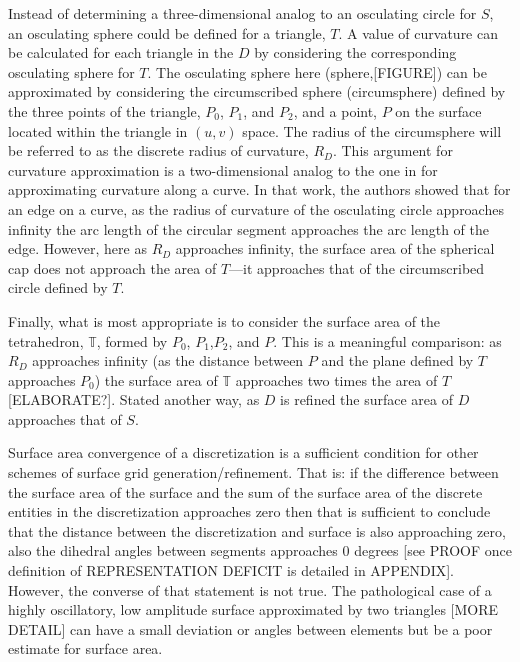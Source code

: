 Instead of determining a three-dimensional analog to an osculating
circle for $S$, an osculating sphere could be defined for a triangle,
$T$. A value of curvature can be calculated for each triangle in the $D$
by considering the corresponding osculating sphere for $T$. The
osculating sphere here (sphere,[FIGURE]) can be approximated by
considering the circumscribed sphere (circumsphere) \cite{casey1888}
defined by the three points of the triangle, $P_0$, $P_1$, and $P_2$,
and a point, $P$ on the surface located within the triangle in $(u,v)$
space. The radius of the circumsphere will be referred to as the
discrete radius of curvature, $R_D$. This argument for curvature
approximation is a two-dimensional analog to the one in
\cite{mclaurin12} for approximating curvature along a curve. In that
work, the authors showed that for an edge on a curve, as the radius of
curvature of the osculating circle approaches infinity the arc length of
the circular segment approaches the arc length of the edge. However,
here as $R_D$ approaches infinity, the surface area of the spherical cap
does not approach the area of $T$---it approaches that of the
circumscribed circle defined by $T$.

Finally, what is most appropriate is to consider the surface area of the
tetrahedron, ${\mathbb T}$, formed by $P_0$, $P_1$,$P_2$, and $P$. This
is a meaningful comparison: as $R_D$ approaches infinity (as the
distance between $P$ and the plane defined by $T$ approaches $P_0$) the
surface area of ${\mathbb T}$ approaches two times the area of
$T$[ELABORATE?].  Stated another way, as $D$ is refined the surface area
of $D$ approaches that of $S$.

Surface area convergence of a discretization is a sufficient condition
for other schemes of surface grid generation/refinement. That is: if the
difference between the surface area of the surface and the sum of the
surface area of the discrete entities in the discretization approaches
zero then that is sufficient to conclude that the distance between the
discretization and surface is also approaching zero, also the dihedral
angles between segments approaches $0$ degrees [see PROOF once
definition of REPRESENTATION DEFICIT is detailed in APPENDIX]. However,
the converse of that statement is not true. The pathological case of a
highly oscillatory, low amplitude surface approximated by two triangles
[MORE DETAIL] can have a small deviation or angles between elements
but be a poor estimate for surface area.
